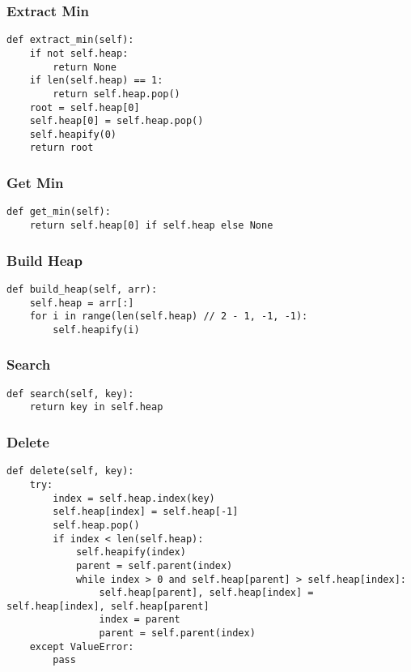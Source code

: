 \subsubsection{Extract Min}
\begin{algo}
\begin{lstlisting}
def extract_min(self):
    if not self.heap:
        return None
    if len(self.heap) == 1:
        return self.heap.pop()
    root = self.heap[0]
    self.heap[0] = self.heap.pop()
    self.heapify(0)
    return root
\end{lstlisting}
\end{algo}

\subsubsection{Get Min}
\begin{algo}
\begin{lstlisting}
def get_min(self):
    return self.heap[0] if self.heap else None
\end{lstlisting}
\end{algo}

\subsubsection{Build Heap}
\begin{algo}
\begin{lstlisting}
def build_heap(self, arr):
    self.heap = arr[:]
    for i in range(len(self.heap) // 2 - 1, -1, -1):
        self.heapify(i)
\end{lstlisting}
\end{algo}

\subsubsection{Search}
\begin{algo}
\begin{lstlisting}
def search(self, key):
    return key in self.heap
\end{lstlisting}
\end{algo}

\subsubsection{Delete}
\begin{algo}
\begin{lstlisting}
def delete(self, key):
    try:
        index = self.heap.index(key)
        self.heap[index] = self.heap[-1]
        self.heap.pop()
        if index < len(self.heap):
            self.heapify(index)
            parent = self.parent(index)
            while index > 0 and self.heap[parent] > self.heap[index]:
                self.heap[parent], self.heap[index] = self.heap[index], self.heap[parent]
                index = parent
                parent = self.parent(index)
    except ValueError:
        pass
\end{lstlisting}
\end{algo}

